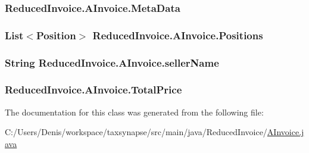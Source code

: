 \subsubsection[{\texorpdfstring{Meta\+Data}{MetaData}}]{ Reduced\+Invoice.\+A\+Invoice.\+Meta\+Data\hspace{0.3cm}{\ttfamily [protected]}}\hypertarget{class_reduced_invoice_1_1_a_invoice_a7561c82ce51807a2c48a9b80cf45b411}{}\label{class_reduced_invoice_1_1_a_invoice_a7561c82ce51807a2c48a9b80cf45b411}
\subsubsection[{\texorpdfstring{Positions}{Positions}}]{\setlength{\rightskip}{0pt plus 5cm}List$<${\bf Position}$>$ Reduced\+Invoice.\+A\+Invoice.\+Positions\hspace{0.3cm}{\ttfamily [protected]}}\hypertarget{class_reduced_invoice_1_1_a_invoice_a5b51f1865386bd021580507c7133f69a}{}\label{class_reduced_invoice_1_1_a_invoice_a5b51f1865386bd021580507c7133f69a}
\subsubsection[{\texorpdfstring{seller\+Name}{sellerName}}]{\setlength{\rightskip}{0pt plus 5cm}String Reduced\+Invoice.\+A\+Invoice.\+seller\+Name\hspace{0.3cm}{\ttfamily [protected]}}\hypertarget{class_reduced_invoice_1_1_a_invoice_ae00a97e1c74841fe0b0b43fccd1da24d}{}\label{class_reduced_invoice_1_1_a_invoice_ae00a97e1c74841fe0b0b43fccd1da24d}
\subsubsection[{\texorpdfstring{Total\+Price}{TotalPrice}}]{ Reduced\+Invoice.\+A\+Invoice.\+Total\+Price\hspace{0.3cm}{\ttfamily [protected]}}\hypertarget{class_reduced_invoice_1_1_a_invoice_a72b831e7ee0b4501fc949f61aecdd498}{}\label{class_reduced_invoice_1_1_a_invoice_a72b831e7ee0b4501fc949f61aecdd498}


The documentation for this class was generated from the following file\+:\begin{DoxyCompactItemize}
\item 
C\+:/\+Users/\+Denis/workspace/taxsynapse/src/main/java/\+Reduced\+Invoice/\hyperlink{_a_invoice_8java}{A\+Invoice.\+java}\end{DoxyCompactItemize}
